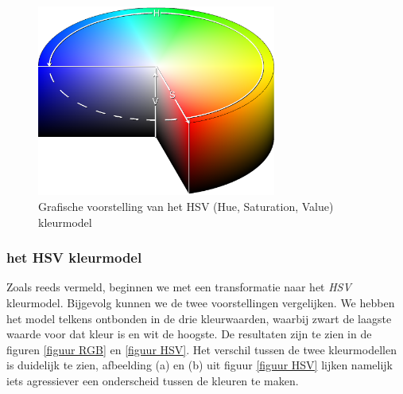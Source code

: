 \documentclass[a4paper,kulak]{kulakarticle}
\begin{document}
	\begin{figure}[H]
	\centering
	\includegraphics[width=0.7\textwidth]{HSV_vb.png}
	
	\caption{Grafische voorstelling van het HSV (Hue, Saturation, Value) kleurmodel}
	\label{figuur hsv_schema}
	\end{figure}

	\subsubsection{het HSV kleurmodel}
		Zoals reeds vermeld, beginnen we met een transformatie naar het \textit{HSV} kleurmodel. Bijgevolg kunnen we de twee voorstellingen vergelijken. We hebben het model telkens ontbonden in de drie kleurwaarden, waarbij zwart de laagste waarde voor dat kleur is en wit de hoogste. De resultaten zijn te zien in de figuren \ref{figuur RGB} en \ref{figuur HSV}. Het verschil tussen de twee kleurmodellen is duidelijk te zien, afbeelding (a) en (b) uit figuur \ref{figuur HSV} lijken namelijk iets agressiever een onderscheid tussen de kleuren te maken.
\end{document}
